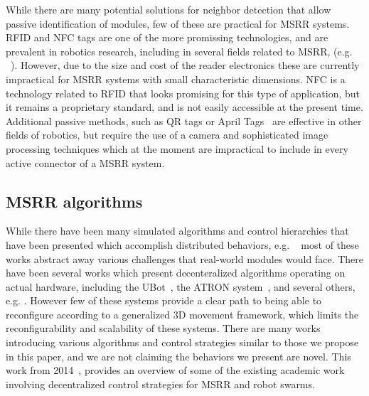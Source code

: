 While there are many potential solutions for neighbor detection that allow passive identification of modules, few of these are practical for MSRR systems. RFID and NFC tags are one of the more promissing technologies, and are prevalent in robotics research, including in several fields related to MSRR, (e.g. ~\cite{werfel2006distributed}). However, due to the size and cost of the reader electronics these are currently impractical for MSRR systems with small characteristic dimensions. NFC is a technology related to RFID that looks promising for this type of application, but it remains a proprietary standard, and is not easily accessible at the present time. Additional passive methods, such as QR tags or April Tags~\cite{wang2016iros} are effective in other fields of robotics, but require the use of a camera and sophisticated image processing techniques which at the moment are impractical to include in every active connector of a MSRR system.

\subsection{MSRR algorithms}
\label{ssec:RW-Algorithmic}
While there have been many simulated algorithms and control hierarchies that have been presented which accomplish distributed behaviors, e.g. ~\cite{Jones-ICRA03, butler2002generic, stoy-747simulation-2004} most of these works abstract away various challenges that real-world modules would face. There have been several works which present decenteralized algorithms operating on actual hardware, including the UBot~\cite{zhu2015simplified}, the ATRON system~\cite{christensen2013distributed}, and several others, e.g. \cite{germanswarm-Levi-2014, Yim-IROS07}. However few of these systems provide a clear path to being able to reconfigure according to a generalized 3D movement framework, which limits the reconfigurability and scalability of these systems. There are many works introducing various algorithms and control strategies similar to those we propose in this paper, and we are not claiming the behaviors we present are novel. This work from 2014~\cite{abukhalil2013survey}, provides an overview of some of the existing academic work involving decentralized control strategies for MSRR and robot swarms.

